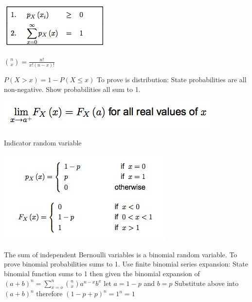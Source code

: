 \documentclass{/out/app/latex/examnotes}
\begin{document}
\includegraphics[scale=0.8]{./img/2dis.jpg}

$\binom{n}{x} = \displaystyle\frac{n!}{x!(n-x)!}$

\vspace{6pt}
\ra $P(X>x)=1-P(X\le x)$
\vspace{6pt}
\ra To prove is distribution: 
 State probabilities are all non-negative.
 Show probabilities all sum to 1.
 
\includegraphics[scale=0.5]{./img/2contright.jpg}


\vspace{6pt}

\disobeylines
Indicator random variable  %
\obeylines

\includegraphics[scale=0.5]{./img/2ber.jpg}


\ra The sum of independent Bernoulli variables is a binomial random variable. 
\ra To prove binomial probabilities sums to 1. Use finite binomial series expansion:
 State binomial function sums to 1
 then given the binomial expansion of $(a+b)^n=\sum_{x=o}^n \binom{n}{x} a^{n-x}b^x$
 let $a=1-p$  and $b=p$
 Substitute above into $(a+b)^n$
 therefore $(1-p+p)^n=1^n=1$
\end{document}
